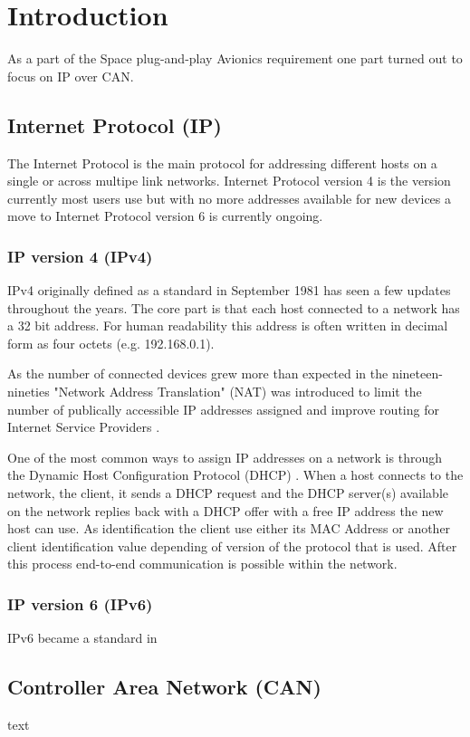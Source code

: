 \section{Introduction}\label{sec:introduction}
As a part of the Space plug-and-play Avionics requirement one part turned out
to focus on IP over CAN.

\subsection{Internet Protocol (IP)}
The Internet Protocol is the main protocol for addressing different hosts on a
single or across multipe link networks. Internet Protocol version 4 is the
version currently most users use but with no more addresses available
for new devices a move to Internet Protocol version 6 is currently ongoing.

\subsubsection{IP version 4 (IPv4)}
IPv4 originally defined as a standard in September 1981 \cite{web:rfc791} has
seen a few updates throughout the years. The core part is that each host
connected to a network has a 32 bit address. For human readability this address
is often written in decimal form as four octets (e.g. 192.168.0.1).

As the number of connected devices grew more than expected in the nineteen-nineties
"Network Address Translation" (NAT) was introduced to limit the number of
publically accessible IP addresses assigned and improve routing for Internet
Service Providers \cite{web:rfc1631, web:rfc1918, web:rfc3022}.

One of the most common ways to assign IP addresses on a network is through the
Dynamic Host Configuration Protocol (DHCP) \cite{web:rfc2131, web:rfc2132, web:rfc4361}.
When a host connects to the network, the client, it sends a DHCP request and the DHCP
server(s) available on the network replies back with a DHCP offer with a free
IP address the new host can use. As identification the client use either its
MAC Address or another client identification value depending of version of the
protocol that is used. After this process end-to-end communication is possible
within the network.

\subsubsection{IP version 6 (IPv6)}
IPv6 became a standard in 

\subsection{Controller Area Network (CAN)}
text
